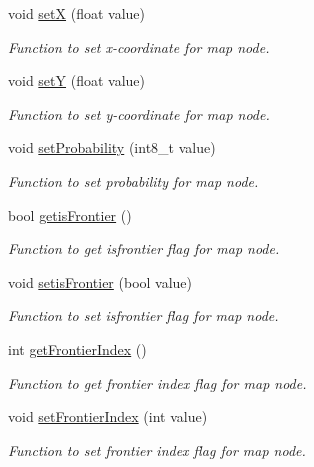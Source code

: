 \begin{DoxyCompactItemize}
void \hyperlink{classMapNode_a3e8c9e037ee794230866d86d06a74f04}{setX} (float value)
\begin{DoxyCompactList}\small\item\em Function to set x-\/coordinate for map node. \end{DoxyCompactList}\item 
void \hyperlink{classMapNode_a4b5be155789e2f163a50c983f209dd3d}{setY} (float value)
\begin{DoxyCompactList}\small\item\em Function to set y-\/coordinate for map node. \end{DoxyCompactList}\item 
void \hyperlink{classMapNode_a1afc2f93a9a43f8455e1aad31e558d60}{set\+Probability} (int8\+\_\+t value)
\begin{DoxyCompactList}\small\item\em Function to set probability for map node. \end{DoxyCompactList}\item 
bool \hyperlink{classMapNode_a1fe4585ed4d0b47f7f243c55d7696a84}{getis\+Frontier} ()
\begin{DoxyCompactList}\small\item\em Function to get isfrontier flag for map node. \end{DoxyCompactList}\item 
void \hyperlink{classMapNode_a9d29e10437231fb65dedffdcb855be66}{setis\+Frontier} (bool value)
\begin{DoxyCompactList}\small\item\em Function to set isfrontier flag for map node. \end{DoxyCompactList}\item 
int \hyperlink{classMapNode_a238c0b6630846662b2ad9c34c242af5d}{get\+Frontier\+Index} ()
\begin{DoxyCompactList}\small\item\em Function to get frontier index flag for map node. \end{DoxyCompactList}\item 
void \hyperlink{classMapNode_a859724964cd0718994819500ba482079}{set\+Frontier\+Index} (int value)
\begin{DoxyCompactList}\small\item\em Function to set frontier index flag for map node. \end{DoxyCompactList}\end{DoxyCompactItemize}


